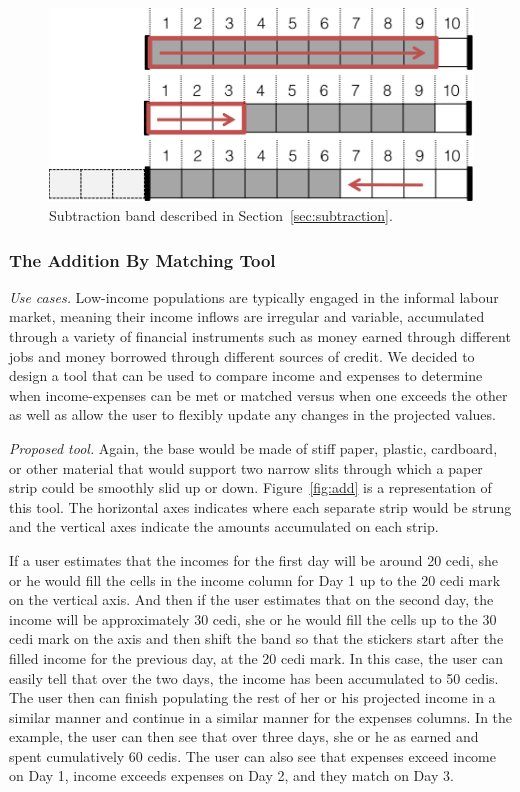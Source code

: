 \documentclass{sig-alternate}
\begin{document}
\begin{figure}
\centering
\includegraphics[width=.7\linewidth]{img/band.png}
\caption{Subtraction band described in Section~\ref{sec:subtraction}.}
\label{fig:band}
\end{figure}

\subsubsection{The Addition By Matching Tool}
\label{sec:add}

\emph{Use cases.} Low-income populations are typically engaged in the informal labour market, meaning their income inflows are irregular and variable, accumulated through a variety of financial instruments such as money earned through different jobs and money borrowed through different sources of credit. We decided to design a tool that can be used to compare income and expenses to determine when income-expenses can be met or matched versus when one exceeds the other as well as allow the user to flexibly update any changes in the projected values.

\emph{Proposed tool.} Again, the base would be made of stiff paper, plastic, cardboard, or other material that would support two narrow slits through which a paper strip could be smoothly slid up or down. Figure~\ref{fig:add} is a representation of this tool. The horizontal axes indicates where each separate strip would be strung and the vertical axes indicate the amounts accumulated on each strip.

If a user estimates that the incomes for the first day will be around 20 cedi, she or he would fill the cells in the income column for Day 1 up to the 20 cedi mark on the vertical axis. And then if the user estimates that on the second day, the income will be approximately 30 cedi, she or he would fill the cells up to the 30 cedi mark on the axis and then shift the band so that the stickers start after the filled income for the previous day, at the 20 cedi mark. In this case, the user can easily tell that over the two days, the income has been accumulated to 50 cedis. The user then can finish populating the rest of her or his projected income in a similar manner and continue in a similar manner for the expenses columns. In the example, the user can then see that over three days, she or he as earned and spent cumulatively 60 cedis. The user can also see that expenses exceed income on Day 1, income exceeds expenses on Day 2, and they match on Day 3.
\end{document}
